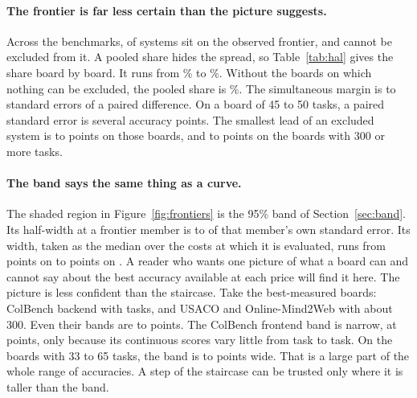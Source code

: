 \documentclass[11pt]{article}
\begin{document}
\paragraph{The frontier is far less certain than the picture suggests.}
Across the \NumHalBoards{} benchmarks, \NumHalObservedFrontier{} of \NumHalSystems{} systems sit on the observed frontier, and \NumHalFrontierSet{} cannot be excluded from it. A pooled share hides the spread, so Table~\ref{tab:hal} gives the share board by board. It runs from \NumHalSetShareMinPct\% to \NumHalSetShareMaxPct\%. Without the \NumHalBoardsSetAll{} boards on which nothing can be excluded, the pooled share is \NumHalFrontierSetPctNoVacuous\%. The simultaneous margin is \NumHalMarginSeMin{} to \NumHalMarginSeMax{} standard errors of a paired difference. On a board of 45 to 50 tasks, a paired standard error is several accuracy points. The smallest lead of an excluded system is \NumExclLeadSmallMin{} to \NumExclLeadSmallMax{} points on those boards, and \NumExclLeadLargeMin{} to \NumExclLeadLargeMax{} points on the boards with 300 or more tasks.

\paragraph{The band says the same thing as a curve.}
The shaded region in Figure~\ref{fig:frontiers} is the 95\% band of Section~\ref{sec:band}. Its half-width at a frontier member is \NumHalBandCMin{} to \NumHalBandCMax{} of that member's own standard error. Its width, taken as the median over the costs at which it is evaluated, runs from \NumHalBandWidthMin{} points on \NumHalBandWidthMinName{} to \NumHalBandWidthMax{} points on \NumHalBandWidthMaxName. A reader who wants one picture of what a board can and cannot say about the best accuracy available at each price will find it here. The picture is less confident than the staircase. Take the best-measured boards: ColBench backend with \NumColbenchBackendProgrammingTasks{} tasks, and USACO and Online-Mind2Web with about 300. Even their bands are \NumColbenchBackendProgrammingBandWidth{} to \NumOnlineMindTwowebBandWidth{} points. The ColBench frontend band is narrow, at \NumColbenchFrontendDesignBandWidth{} points, only because its continuous scores vary little from task to task. On the boards with 33 to 65 tasks, the band is \NumScicodeBandWidth{} to \NumCorebenchHardBandWidth{} points wide. That is a large part of the whole range of accuracies. A step of the staircase can be trusted only where it is taller than the band.
\end{document}
